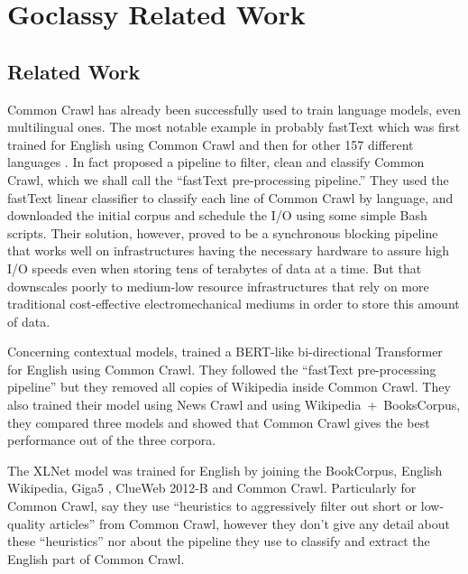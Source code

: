 \chapter{Goclassy Related Work}

\section{Related Work}

Common Crawl has already been successfully used to train language models, even multilingual ones. The most notable example in probably fastText which was first trained for English using Common Crawl \citep{mikolov-etal-2018-advances} and then for other 157 different languages \citep{grave-etal-2018-learning}. In fact \citet{grave-etal-2018-learning} proposed a pipeline to filter, clean and classify Common Crawl, which we shall call the ``fastText pre-processing pipeline.'' They used the fastText linear classifier \citep{joulin-etal-2016-fasttext, joulin-etal-2017-bag} to classify each line of Common Crawl by language, and downloaded the initial corpus and schedule the I/O using some simple Bash scripts. Their solution, however, proved to be a synchronous blocking pipeline that works well on infrastructures having the necessary hardware to assure high I/O speeds even when storing tens of terabytes of data at a time. But that downscales poorly to medium-low resource infrastructures that rely on more traditional cost-effective electromechanical mediums in order to store this amount of data.

Concerning contextual models, \citet{baevski-etal-2019-cloze} trained a BERT-like bi-directional Transformer for English using Common Crawl. They followed the ``fastText pre-processing pipeline'' but they removed all copies of Wikipedia inside Common Crawl. They also trained their model using News Crawl \citep{bojar-etal-2018-findings} and using Wikipedia~+~BooksCorpus, they compared three models and showed that Common Crawl gives the best performance out of the three corpora.

The XLNet model was trained for English by joining the BookCorpus, English Wikipedia, Giga5 \citep{parker-etal-2011-english}, ClueWeb 2012-B \citep{callan-etal-2009-clueweb09} and Common Crawl. Particularly for Common Crawl, \citet{yang-etal-2019-xlnet} say they use ``heuristics to aggressively filter out short or low-quality articles'' from Common Crawl, however they don't give any detail about these ``heuristics'' nor about the pipeline they use to classify and extract the English part of Common Crawl.

